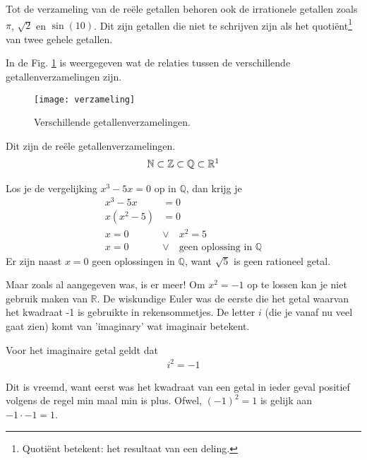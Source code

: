 \documentclass[11pt,fleqn]{book} %
\begin{document}
Tot de verzameling van de reële getallen behoren ook de irrationele getallen zoals $\pi$, $\sqrt{2}$ en $\sin{(10)}$. Dit zijn getallen die niet te schrijven zijn als het quotiënt\footnote{Quotiënt betekent: het resultaat van een deling.} van twee gehele getallen.

In de Fig. \ref{fig:verzameling} is weergegeven wat de relaties tussen de verschillende getallenverzamelingen zijn.

\begin{figure}[h]
	\centering\texttt{[image: verzameling]}
	\caption{Verschillende getallenverzamelingen.}
	\label{fig:verzameling}
\end{figure}

\begin{definition}\label{eq:rf}
Dit zijn de reële getallenverzamelingen.
\begin{align}
\mathbb{N} \subset \mathbb{Z} \subset \mathbb{Q} \subset\mathbb{R}\footnotemark
\end{align}
\end{definition}

Los je de vergelijking $x^3-5x=0$ op in $\mathbb{Q}$, dan krijg je
\begin{displaymath}
\begin{aligned}
x^3-5x&=0\\
x(x^2-5)&=0\\
x=0 \quad &\vee \quad x^2=5\\
x=0 \quad &\vee \quad \text{geen oplossing in } \mathbb{Q}
\end{aligned}
\end{displaymath}
Er zijn naast $x=0$ geen oplossingen in $\mathbb{Q}$, want $\sqrt{5}$ is geen rationeel getal.

Maar zoals al aangegeven was, is er meer! Om $x^2=-1$ op te lossen kan je niet gebruik maken van $\mathbb{R}$. De wiskundige Euler was de eerste die het getal waarvan het kwadraat -1 is gebruikte in rekensommetjes. De letter $i$ (die je vanaf nu veel gaat zien) komt van 'imaginary' wat imaginair betekent.
\begin{definition}
Voor het imaginaire getal geldt dat
\begin{align}
i^2  = -1
\end{align}
\end{definition}
Dit is vreemd, want eerst was het kwadraat van een getal in ieder geval positief volgens de regel min maal min is plus. Ofwel, $(-1)^2=1$ is gelijk aan $-1\cdot-1=1$.
\end{document}
